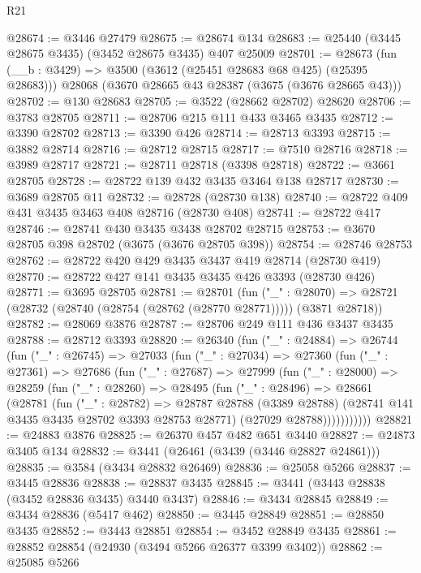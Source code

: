 \begin{lexlean}{R21}
\begin{coremodule}
@28674 := @3446 @27479
@28675 := @28674 @134
@28683 := @25440 (@3445 @28675 @3435) (@3452 @28675 @3435) @407 @25009
@28701 := @28673
    (fun (__b : @3429) => @3500 (@3612 (@25451 @28683 @68 @425) (@25395 @28683)))
    @28068
    (@3670 @28665 @43 @28387 (@3675 (@3676 @28665 @43)))
@28702 := @130 @28683
@28705 := @3522 (@28662 @28702) @28620
@28706 := @3783 @28705
@28711 := @28706 @215 @111 @433 @3465 @3435
@28712 := @3390 @28702
@28713 := @3390 @426
@28714 := @28713 @3393
@28715 := @3882 @28714
@28716 := @28712 @28715
@28717 := @7510 @28716
@28718 := @3989 @28717
@28721 := @28711 @28718 (@3398 @28718)
@28722 := @3661 @28705
@28728 := @28722 @139 @432 @3435 @3464 @138 @28717
@28730 := @3689 @28705 @11
@28732 := @28728 (@28730 @138)
@28740 := @28722 @409 @431 @3435 @3463 @408 @28716 (@28730 @408)
@28741 := @28722 @417
@28746 := @28741 @430 @3435 @3438 @28702 @28715
@28753 := @3670 @28705 @398 @28702 (@3675 (@3676 @28705 @398))
@28754 := @28746 @28753
@28762 := @28722 @420 @429 @3435 @3437 @419 @28714 (@28730 @419)
@28770 := @28722 @427 @141 @3435 @3435 @426 @3393 (@28730 @426)
@28771 := @3695 @28705
@28781 := @28701
    (fun ("_" : @28070) =>
    @28721 (@28732 (@28740 (@28754 (@28762 (@28770 @28771))))) (@3871 @28718))
@28782 := @28069 @3876
@28787 := @28706 @249 @111 @436 @3437 @3435
@28788 := @28712 @3393
@28820 := @26340
    (fun ("_" : @24884) =>
    @26744
      (fun ("_" : @26745) =>
      @27033
        (fun ("_" : @27034) =>
        @27360
          (fun ("_" : @27361) =>
          @27686
            (fun ("_" : @27687) =>
            @27999
              (fun ("_" : @28000) =>
              @28259
                (fun ("_" : @28260) =>
                @28495
                  (fun ("_" : @28496) =>
                  @28661
                    (@28781
                      (fun ("_" : @28782) =>
                      @28787
                        @28788
                        (@3389 @28788)
                        (@28741 @141 @3435 @3435 @28702 @3393 @28753 @28771)
                        (@27029 @28788)))))))))))
@28821 := @24883 @3876
@28825 := @26370 @457 @482 @651 @3440
@28827 := @24873 @3405 @134
@28832 := @3441 (@26461 (@3439 (@3446 @28827 @24861)))
@28835 := @3584 (@3434 @28832 @26469)
@28836 := @25058 @5266
@28837 := @3445 @28836
@28838 := @28837 @3435
@28845 := @3441 (@3443 @28838 (@3452 @28836 @3435) @3440 @3437)
@28846 := @3434 @28845
@28849 := @3434 @28836 (@5417 @462)
@28850 := @3445 @28849
@28851 := @28850 @3435
@28852 := @3443 @28851
@28854 := @3452 @28849 @3435
@28861 := @28852 @28854 (@24930 (@3494 @5266 @26377 @3399 @3402))
@28862 := @25085 @5266

\end{coremodule}
\end{lexlean}
